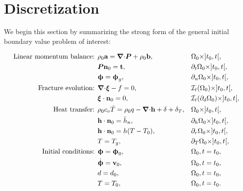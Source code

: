 \section{Discretization}
\label{section: framework/discretization}

We begin this section by summarizing the strong form of the general initial boundary value problem of interest:
\begin{mdframed}[
    frametitle={The initial boundary value problem for the time interval $t \in I = [t_0, t_f]$},
    frametitlebackgroundcolor=gray!20,
    backgroundcolor=gray!5,
    linewidth=0pt,
    nobreak=true
  ]
  \begin{align*}
    \text{Linear momentum balance: }   & \rho_0 \textbf{a} = {\boldsymbol{\nabla} \cdot} \boldsymbol{P} + \rho_0 \textbf{b},                           &  & \Omega_0 \times ]t_0, t[,           \\
                                       & \boldsymbol{P} \textbf{n}_0 = \textbf{t},                                                  &  & \partial_t\Omega_0 \times ]t_0, t[, \\
                                       & \boldsymbol{\upphi} = \boldsymbol{\upphi}_g,                                            &  & \partial_u\Omega_0 \times ]t_0, t[, \\
    \text{Fracture evolution: }        & {\boldsymbol{\nabla} \cdot} \boldsymbol{\xi} - f = 0,                                           &  & \mathcal{I}_t(\Omega_0) \times ]t_0, t[, \\
                                       & \boldsymbol{\xi}\cdot\textbf{n}_0 = 0,                                             &  & \mathcal{I}_t(\partial_d\Omega_0) \times ]t_0, t[, \\
    \text{Heat transfer: }             & \rho_0c_v\dot{T} = \rho_0 q - {\boldsymbol{\nabla} \cdot} \textbf{h} + \delta + \delta_T,     &  & \Omega_0 \times ]t_0, t[, \\
                                       & \textbf{h} \cdot \textbf{n}_0 = \bar{h}_n,                                       &  & \partial_h\Omega_0 \times ]t_0, t[, \\
                                       & \textbf{h} \cdot \textbf{n}_0 = h(T - T_0),                                      &  & \partial_r\Omega_0 \times ]t_0, t[, \\
                                       & T = T_g,                                                                &  & \partial_T\Omega_0 \times ]t_0, t[, \\
    \text{Initial conditions: }        & \boldsymbol{\upphi} = \boldsymbol{\upphi}_0,                                            &  & \Omega_0, t = t_0, \\
                                       & \dot{\boldsymbol{\upphi}} = \textbf{v}_0,                                             &  & \Omega_0, t = t_0, \\
                                       & d = d_0,                                                                &  & \Omega_0, t = t_0, \\
                                       & T = T_0,                                                                &  & \Omega_0, t = t_0.
  \end{align*}
\end{mdframed}
